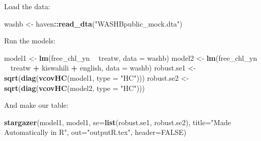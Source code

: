 \documentclass[11pt,]{article}
\newenvironment{Shaded}{\begin{snugshade}}{\end{snugshade}}
\newcommand{\KeywordTok}[1]{\textcolor[rgb]{0.13,0.29,0.53}{\textbf{#1}}}
\newcommand{\DataTypeTok}[1]{\textcolor[rgb]{0.13,0.29,0.53}{#1}}
\newcommand{\StringTok}[1]{\textcolor[rgb]{0.31,0.60,0.02}{#1}}
\newcommand{\OtherTok}[1]{\textcolor[rgb]{0.56,0.35,0.01}{#1}}
\newcommand{\OperatorTok}[1]{\textcolor[rgb]{0.81,0.36,0.00}{\textbf{#1}}}
\newcommand{\NormalTok}[1]{#1}
\begin{document}
Load the data:

\begin{Shaded}
\begin{Highlighting}[]
\NormalTok{washb <-}\StringTok{ }\NormalTok{haven}\OperatorTok{::}\KeywordTok{read_dta}\NormalTok{(}\StringTok{"WASHBpublic_mock.dta"}\NormalTok{)}
\end{Highlighting}
\end{Shaded}

Run the models:

\begin{Shaded}
\begin{Highlighting}[]
\NormalTok{model1 <-}\StringTok{ }\KeywordTok{lm}\NormalTok{(free_chl_yn }\OperatorTok{~}\StringTok{ }\NormalTok{treatw, }\DataTypeTok{data =}\NormalTok{ washb) }
\NormalTok{model2 <-}\StringTok{ }\KeywordTok{lm}\NormalTok{(free_chl_yn }\OperatorTok{~}\StringTok{ }\NormalTok{treatw }\OperatorTok{+}\StringTok{ }\NormalTok{kiswahili }\OperatorTok{+}\StringTok{ }\NormalTok{english, }\DataTypeTok{data =}\NormalTok{ washb)}
\NormalTok{robust.se1 <-}\StringTok{ }\KeywordTok{sqrt}\NormalTok{(}\KeywordTok{diag}\NormalTok{(}\KeywordTok{vcovHC}\NormalTok{(model1, }\DataTypeTok{type =} \StringTok{"HC"}\NormalTok{)))}
\NormalTok{robust.se2 <-}\StringTok{ }\KeywordTok{sqrt}\NormalTok{(}\KeywordTok{diag}\NormalTok{(}\KeywordTok{vcovHC}\NormalTok{(model2, }\DataTypeTok{type =} \StringTok{"HC"}\NormalTok{)))}
\end{Highlighting}
\end{Shaded}

And make our table:

\begin{Shaded}
\begin{Highlighting}[]
\KeywordTok{stargazer}\NormalTok{(model1, model1, }\DataTypeTok{se=}\KeywordTok{list}\NormalTok{(robust.se1, robust.se2), }
          \DataTypeTok{title=}\StringTok{"Made Automatically in R"}\NormalTok{, }
          \DataTypeTok{out=}\StringTok{"outputR.tex"}\NormalTok{, }\DataTypeTok{header=}\OtherTok{FALSE}\NormalTok{)}
\end{Highlighting}
\end{Shaded}
\end{document}
